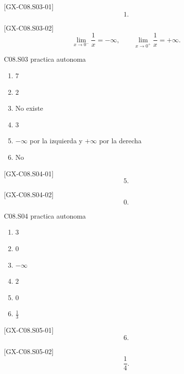 \begin{shortanswer}{[GX-C08.S03-01]}
\[
1.
\]
\end{shortanswer}

\begin{shortanswer}{[GX-C08.S03-02]}
\[
\lim_{x\to 0^-}\frac{1}{x}=-\infty,\qquad
\lim_{x\to 0^+}\frac{1}{x}=+\infty.
\]
\end{shortanswer}

\begin{shortanswer}{C08.S03 practica autonoma}
\begin{enumerate}[label=\textbf{PX-C08.S03-\arabic*:}, leftmargin=*]
  \item \(7\)
  \item \(2\)
  \item No existe
  \item \(3\)
  \item \(-\infty\) por la izquierda y \(+\infty\) por la derecha
  \item No
\end{enumerate}
\end{shortanswer}

\begin{shortanswer}{[GX-C08.S04-01]}
\[
5.
\]
\end{shortanswer}

\begin{shortanswer}{[GX-C08.S04-02]}
\[
0.
\]
\end{shortanswer}

\begin{shortanswer}{C08.S04 practica autonoma}
\begin{enumerate}[label=\textbf{PX-C08.S04-\arabic*:}, leftmargin=*]
  \item \(3\)
  \item \(0\)
  \item \(-\infty\)
  \item \(2\)
  \item \(0\)
  \item \(\frac{1}{3}\)
\end{enumerate}
\end{shortanswer}

\begin{shortanswer}{[GX-C08.S05-01]}
\[
6.
\]
\end{shortanswer}

\begin{shortanswer}{[GX-C08.S05-02]}
\[
\frac{1}{4}.
\]
\end{shortanswer}

